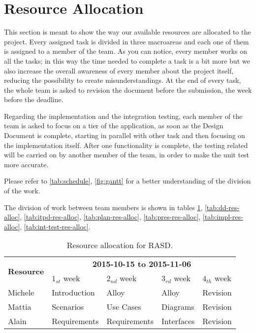 \section{Resource Allocation}

This section is meant to show the way our available resources are allocated to the project. Every assigned task is divided in three macroareas and each one of them is assigned to a member of the team.
As you can notice, every member works on all the tasks; in this way the time needed to complete a task is a bit more but we also increase the overall awareness of every member about the project itself, reducing the possibility to create misunderstandings.
At the end of every task, the whole team is asked to revision the document before the submission, the week before the deadline.

Regarding the implementation and the integration testing, each member of the team is asked to focus on a tier of the application, as soon as the Design Document is complete, starting in parallel with other task and then focusing on the implementation itself.
After one functionality is complete, the testing related will be carried on by another member of the team, in order to make the unit test more accurate.

Please refer to \autoref{tab:schedule}, \autoref{fig:gantt} for a better understanding of the division of the work.

The division of work between team members is shown in tables \ref{tab:rasd-res-alloc}, \ref{tab:dd-res-alloc}, \ref{tab:itpd-res-alloc}, \ref{tab:plan-res-alloc}, \ref{tab:pres-res-alloc}, \ref{tab:impl-res-alloc}, \ref{tab:int-test-res-alloc}.

\begin{table}
    \centering
    \begin{small}
    \begin{tabular}{| l | l | l | l | l |}
        \hline
        \multirow{2}{*}{\textbf{Resource}} & \multicolumn{4}{c|}{\textbf{2015-10-15 to 2015-11-06}} \\
        \cline{2-5}
        & $1_{st}$ week & $2_{nd}$ week & $3_{rd} $ week & $4_{th}$ week\\
        \hline
        Michele     & Introduction  & Alloy          & Alloy       & Revision    \\
        Mattia      & Scenarios     & Use Cases      & Diagrams    & Revision    \\
        Alain       & Requirements  & Requirements   & Interfaces  & Revision    \\
        \hline
    \end{tabular}
    \end{small}
    \caption{Resource allocation for RASD.}
    \label{tab:rasd-res-alloc}
\end{table}

